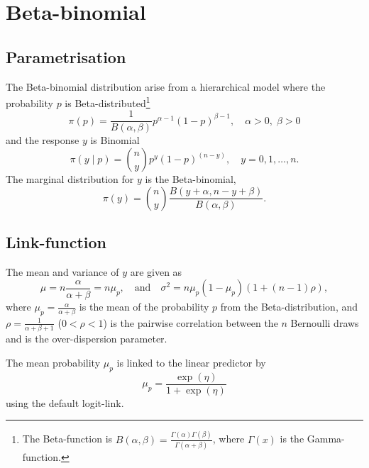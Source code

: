 \documentclass[a4paper,11pt]{article}
\begin{document}
\section*{Beta-binomial}

\subsection*{Parametrisation}

The Beta-binomial distribution arise from a hierarchical model where
the probability $p$ is Beta-distributed\footnote{The Beta-function is
    $B(\alpha, \beta) =
    \frac{\Gamma(\alpha)\Gamma(\beta)}{\Gamma(\alpha+\beta)}$, where
    $\Gamma(x)$ is the Gamma-function.}
\begin{displaymath}
    \pi(p) = \frac{1}{B(\alpha, \beta)}
    p^{\alpha-1}(1-p)^{\beta-1},\quad \alpha > 0, \; \beta > 0
\end{displaymath}
and the response $y$ is Binomial
\begin{displaymath}
    \pi(y\mid p) = {n \choose y} p^y (1-p)^{(n-y)}, \quad y=0, 1,\ldots, n.
\end{displaymath}
The marginal distribution for $y$ is the Beta-binomial,
\begin{displaymath}
    \pi(y) = {n \choose y} \frac{
        B(y+\alpha, n-y + \beta)}{B(\alpha, \beta)}.
\end{displaymath}



\subsection*{Link-function}

The mean and variance of $y$ are given as
\begin{displaymath}
    \mu = n \frac{\alpha}{\alpha+\beta} = n \mu_{p}, \quad\text{and}\quad
    \sigma^{2} = n \mu_{p}(1-\mu_{p}) \left(1 + (n-1)\rho\right),
\end{displaymath}
where $\mu_{p} = \frac{\alpha}{\alpha+\beta}$ is the mean of the
probability $p$ from the Beta-distribution, and $\rho =
\frac{1}{\alpha+\beta+1}$ ($0 < \rho < 1$) is the pairwise
correlation between the $n$ Bernoulli draws and is the over-dispersion
parameter.

The mean probability $\mu_{p}$ is linked to the linear predictor by
\begin{displaymath}
    \mu_p = \frac{\exp(\eta)}{1+\exp(\eta)}
\end{displaymath}
using the default logit-link.
\end{document}
